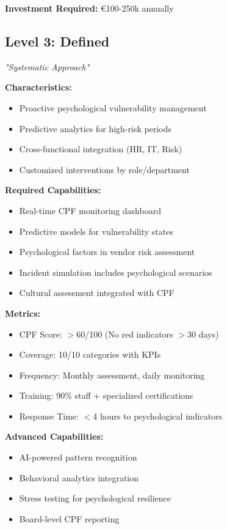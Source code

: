 \documentclass[11pt,a4paper]{article}
\begin{document}
\textbf{Investment Required:} €100-250k annually

\subsection{Level 3: Defined}
\textit{"Systematic Approach"}

\textbf{Characteristics:}
\begin{itemize}
\item Proactive psychological vulnerability management
\item Predictive analytics for high-risk periods
\item Cross-functional integration (HR, IT, Risk)
\item Customized interventions by role/department
\end{itemize}

\textbf{Required Capabilities:}
\begin{itemize}
\item Real-time CPF monitoring dashboard
\item Predictive models for vulnerability states
\item Psychological factors in vendor risk assessment
\item Incident simulation includes psychological scenarios
\item Cultural assessment integrated with CPF
\end{itemize}

\textbf{Metrics:}
\begin{itemize}
\item CPF Score: $>$60/100 (No red indicators $>$30 days)
\item Coverage: 10/10 categories with KPIs
\item Frequency: Monthly assessment, daily monitoring
\item Training: 90\% staff + specialized certifications
\item Response Time: $<$4 hours to psychological indicators
\end{itemize}

\textbf{Advanced Capabilities:}
\begin{itemize}
\item AI-powered pattern recognition
\item Behavioral analytics integration
\item Stress testing for psychological resilience
\item Board-level CPF reporting
\end{itemize}
\end{document}
